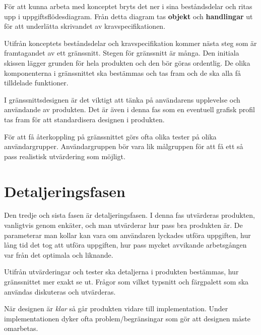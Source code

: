 \documentclass[12pt,a4paper]{article}
\begin{document}
För att kunna arbeta med konceptet bryts det ner i sina beståndsdelar och ritas upp i uppgiftsflödesdiagram. Från detta diagram tas \textbf{objekt} och \textbf{handlingar} ut för att underlätta skrivandet av kravspecifikationen.

Utifrån konceptets beståndsdelar och kravspecifikation kommer nästa steg som är framtagandet av ett gränssnitt. Stegen för gränssnitt är många. Den initiala skissen lägger grunden för hela produkten och den bör göras ordentlig. De olika komponenterna i gränssnittet ska bestämmas och tas fram och de ska alla få tilldelade funktioner.

I gränssnittsdesignen är det viktigt att tänka på användarens upplevelse och användande av produkten. Det är även i denna fas som en eventuell grafisk profil tas fram för att standardisera designen i produkten. 

För att få återkoppling på gränssnittet görs ofta olika tester på olika användargrupper. Användargruppen bör vara lik målgruppen för att få ett så pass realistisk utvärdering som möjligt. 

\section{Detaljeringsfasen}
Den tredje och sista fasen är detaljeringsfasen. I denna fas utvärderas produkten, vanligtvis genom enkäter, och man utvärderar hur pass bra produkten är. De parameterar man kollar kan vara om användaren lyckades utföra uppgiften, hur lång tid det tog att utföra uppgiften, hur pass mycket avvikande arbetsgången var från det optimala och liknande.

Utifrån utvärderingar och tester ska detaljerna i produkten bestämmas, hur gränssnittet mer exakt se ut. Frågor som vilket typsnitt och färgpalett som ska användas diskuteras och utvärderas. 

När designen är \textit{klar} så går produkten vidare till implementation. Under implementationen dyker ofta problem/begränsingar som gör att designen måste omarbetas. 
\end{document}
